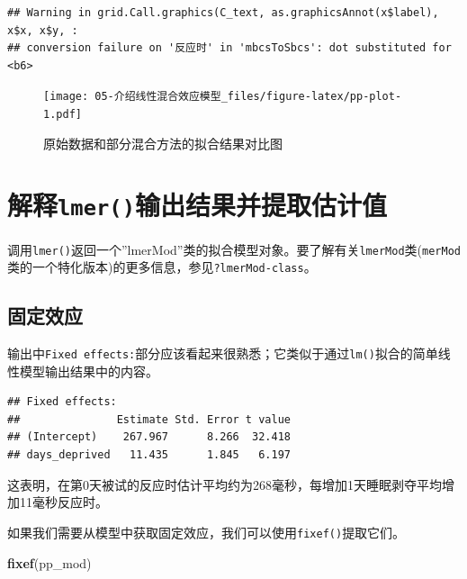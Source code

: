 \documentclass[
]{book}
\newenvironment{Shaded}{\begin{snugshade}}{\end{snugshade}}
\newcommand{\FunctionTok}[1]{\textcolor[rgb]{0.13,0.29,0.53}{\textbf{#1}}}
\newcommand{\NormalTok}[1]{#1}
\begin{document}
\begin{verbatim}
## Warning in grid.Call.graphics(C_text, as.graphicsAnnot(x$label), x$x, x$y, :
## conversion failure on '反应时' in 'mbcsToSbcs': dot substituted for <b6>
\end{verbatim}

\begin{figure}
\centering
\texttt{[image: 05-介绍线性混合效应模型\_files/figure-latex/pp-plot-1.pdf]}
\caption{\label{fig:pp-plot}原始数据和部分混合方法的拟合结果对比图}
\end{figure}

\hypertarget{ux89e3ux91calmerux8f93ux51faux7ed3ux679cux5e76ux63d0ux53d6ux4f30ux8ba1ux503c}{%
\section{\texorpdfstring{解释\texttt{lmer()}输出结果并提取估计值}{解释lmer()输出结果并提取估计值}}\label{ux89e3ux91calmerux8f93ux51faux7ed3ux679cux5e76ux63d0ux53d6ux4f30ux8ba1ux503c}}

调用\texttt{lmer()}返回一个''lmerMod''类的拟合模型对象。要了解有关\texttt{lmerMod}类(\texttt{merMod}类的一个特化版本)的更多信息，参见\texttt{?lmerMod-class}。

\hypertarget{ux56faux5b9aux6548ux5e94}{%
\subsection{固定效应}\label{ux56faux5b9aux6548ux5e94}}

输出中\texttt{Fixed\ effects:}部分应该看起来很熟悉；它类似于通过\texttt{lm()}拟合的简单线性模型输出结果中的内容。

\begin{verbatim}
## Fixed effects:
##               Estimate Std. Error t value
## (Intercept)    267.967      8.266  32.418
## days_deprived   11.435      1.845   6.197
\end{verbatim}

这表明，在第0天被试的反应时估计平均约为268毫秒，每增加1天睡眠剥夺平均增加11毫秒反应时。

如果我们需要从模型中获取固定效应，我们可以使用\texttt{fixef()}提取它们。

\begin{Shaded}
\begin{Highlighting}[]
\FunctionTok{fixef}\NormalTok{(pp\_mod)}
\end{Highlighting}
\end{Shaded}
\end{document}
